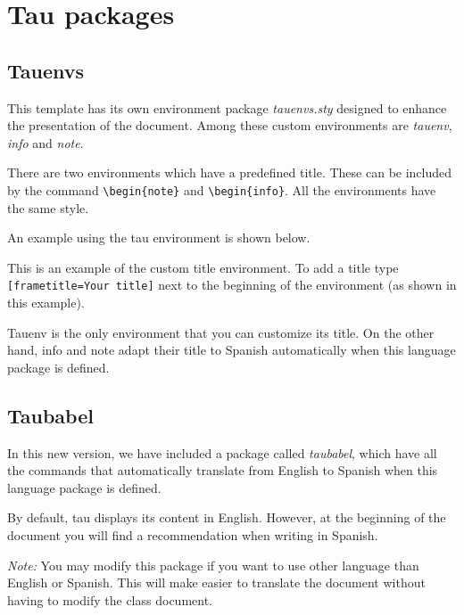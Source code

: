 \documentclass[9pt,a4paper,twoside]{tau-class/tau}
\begin{document}
\section{Tau packages}

    \subsection{Tauenvs}
	
        This template has its own environment package \textit{tauenvs.sty} designed to enhance the presentation of the document. Among these custom environments are \textit{tauenv}, \textit{info} and \textit{note}.
		
        There are two environments which have a predefined title. These can be included by the command \verb|\begin{note}| and \verb|\begin{info}|. All the environments have the same style.
			
        An example using the tau environment is shown below.
		
	\begin{tauenv}[frametitle=Environment with custom title]
            This is an example of the custom title environment. To add a title type \verb|[frametitle=Your title]| next to the beginning of the environment (as shown in this example).
	\end{tauenv}
		
        Tauenv is the only environment that you can customize its title. On the other hand, info and note adapt their title to Spanish automatically when this language package is defined.
		
    \subsection{Taubabel}

        In this new version, we have included a package called \textit{taubabel}, which have all the commands that automatically translate from English to Spanish when this language package is defined. 
        
        By default, tau displays its content in English. However, at the beginning of the document you will find a recommendation when writing in Spanish. 
		
        \textit{Note:} You may modify this package if you want to use other language than English or Spanish. This will make easier to translate the document without having to modify the class document.
		
\end{document}
